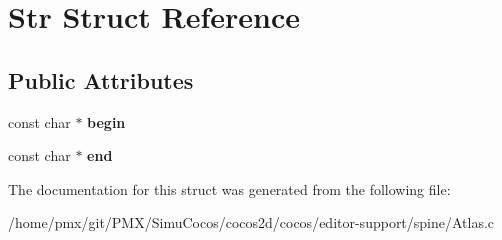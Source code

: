 \hypertarget{structStr}{}\section{Str Struct Reference}
\label{structStr}
\subsection*{Public Attributes}
\begin{DoxyCompactItemize}
\item 
\mbox{\label{structStr_ab78cee3c96c95470818777e5e1ef7a59}} 
const char $\ast$ {\bfseries begin}
\item 
\mbox{\label{structStr_a8534473537ae34a8249fc7e26c6f0a57}} 
const char $\ast$ {\bfseries end}
\end{DoxyCompactItemize}


The documentation for this struct was generated from the following file\+:\begin{DoxyCompactItemize}
\item 
/home/pmx/git/\+P\+M\+X/\+Simu\+Cocos/cocos2d/cocos/editor-\/support/spine/Atlas.\+c\end{DoxyCompactItemize}

